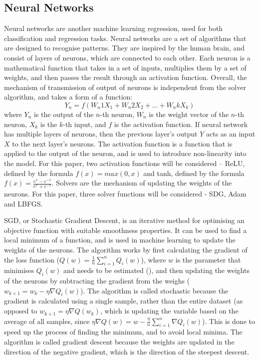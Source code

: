 \documentclass[12pt]{report}
\begin{document}
\subsection{Neural Networks}
Neural networks are another machine learning regression, used for both classification and regression tasks. Neural networks are a set of algorithms that are designed to recognise patterns. They are inspired by the human brain, and consist of layers of neurons, which are connected to each other. Each neuron is a mathematical function that takes in a set of inputs, multiplies them by a set of weights, and then passes the result through an activation function. Overall, the mechanism of transmission of output of neurons is independent from the solver algorithm, and takes a form of a function:
\begin{equation}
	Y_n = f(W_n1X_1 + W_n2X_2 + ... + W_nkX_k)
\end{equation}
where $Y_n$ is the output of the $n$-th neuron, $W_n$ is the weight vector of the $n$-th neuron, $X_k$ is the $k$-th input, and $f$ is the activation function. If neural network has multiple layers of neurons, then the previous layer's output $Y$ acts as an input $X$ to the next layer's neurons. The activation function is a function that is applied to the output of the neuron, and is used to introduce non-linearity into the model. For this paper, two activation functions will be considered -- ReLU, defined by the formula $f(x) = max(0,x)$ and tanh, defined by the formula $f(x) = \frac{e^{x}-e^{-x}}{e^{x}+e^{-x}}$. Solvers are the mechanism of updating the weights of the neurons. For this paper, three solver functions will be considered - SDG, Adam and LBFGS.

SGD, or Stochastic Gradient Descent, is an iterative method for optimising an objective function with suitable smoothness properties. It can be used to find a local minimum of a function, and is used in machine learning to update the weights of the neurons. The algorithm works by first calculating the gradient of the loss function ($Q(w)=\frac{1}{n}\sum_{i=1}^{n}Q_i(w)$), where $w$ is the parameter that minimises $Q_i(w)$ and needs to be estimated (\cite{sra2011}), and then updating the weights of the neurons by subtracting the gradient from the weighs ($w_{k+1}=w_{k}-\eta\nabla Q_i(w)$). The algorithm is called stochastic because the gradient is calculated using a single sample, rather than the entire dataset (as opposed to $w_{k+1}=\eta\nabla Q(w_k)$, which is updating the variable based on the average of all samples, since $\eta\nabla Q(w)=w-\frac{\eta}{n}\sum_{i=1}^{n}\nabla Q_i(w)$). This is done to speed up the process of finding the minimum, and to avoid local minima. The algorithm is called gradient descent because the weights are updated in the direction of the negative gradient, which is the direction of the steepest descent.
\end{document}
